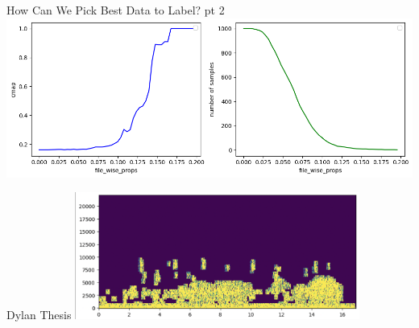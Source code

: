 \begin{frame}{How Can We Pick Best Data to Label? pt 2}
    \centering
    \includegraphics[height=0.9\textheight,width=1\textwidth,keepaspectratio]{images/aid/image (4).png}
\end{frame}

\begin{frame}{Dylan Thesis}
    \centering
    \includegraphics[height=0.7\textheight,width=0.7\textwidth,keepaspectratio]{images/aid/dylan-aid-2-7.png}
\end{frame}





